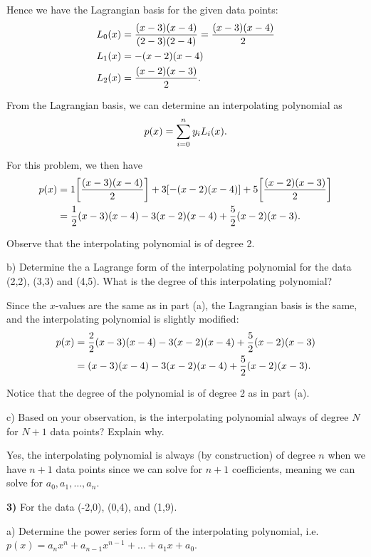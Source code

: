 \documentclass[12pt,a4paper]{article}
\newcommand{\prob}[2]{\textbf{#1)} #2}
\begin{document}
Hence we have the Lagrangian basis for the given data points:
\begin{align*}
    L_0\qty(x) &= \frac{\qty(x-3)\qty(x-4)}{\qty(2-3)\qty(2-4)} = \frac{\qty(x-3)\qty(x-4)}{2} \\
    L_1\qty(x) &= -\qty(x-2)\qty(x-4) \\
    L_2\qty(x) &= \frac{\qty(x-2)\qty(x-3)}{2}
.\end{align*}

From the Lagrangian basis, we can determine an interpolating polynomial as
\begin{align*}
    p\qty(x) = \sum_{i=0}^{n} y_iL_i\qty(x) 
.\end{align*}

For this problem, we then have
\begin{align*}
    p\qty(x) &= 1\qty[\frac{\qty(x-3)\qty(x-4)}{2}] + 3\qty[-\qty(x-2)\qty(x-4)] + 5\qty[\frac{\qty(x-2)\qty(x-3)}{2}]  \\
    &= \frac{1}{2}\qty(x-3)\qty(x-4) - 3\qty(x-2)\qty(x-4)  + \frac{5}{2}\qty(x-2)\qty(x-3) 
.\end{align*}

Observe that the interpolating polynomial is of degree 2.

b) Determine the a Lagrange form of the interpolating polynomial for the data (2,2), (3,3) and (4,5).
What is the degree of this interpolating polynomial?

Since the $x$-values are the same as in part (a), the Lagrangian basis is the same, and the interpolating polynomial is slightly modified:
\begin{align*}
    p\qty(x) &= \frac{2}{2}\qty(x-3)\qty(x-4) - 3\qty(x-2)\qty(x-4)  + \frac{5}{2}\qty(x-2)\qty(x-3) \\
    &= \qty(x-3)\qty(x-4) - 3\qty(x-2)\qty(x-4)  + \frac{5}{2}\qty(x-2)\qty(x-3) 
.\end{align*}

Notice that the degree of the polynomial is of degree 2 as in part (a).

c) Based on your observation, is the interpolating polynomial always of degree $N$ for $N+1$ data points? 
Explain why.

Yes, the interpolating polynomial is always (by construction) of degree $n$ when we have $n+1$ data points since we can solve for $n+1$ coefficients, meaning we can solve for $a_0,a_1,\ldots,a_n$.

\prob{3}{For the data (-2,0), (0,4), and (1,9).}

a) Determine the power series form of the interpolating polynomial, i.e. $p(x) = a_{n}x^{n} + a_{n-1}x^{n-1} + \ldots + a_1x + a_0$.
\end{document}
